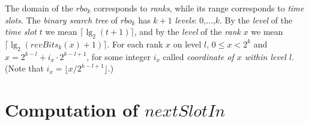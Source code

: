 \documentclass{llncs}
\begin{document}
The domain of the $rbo_k$ corresponds to {\em ranks}, while its range corresponds to {\em time slots}.
The {\em binary search tree} of $rbo_k$ has $k+1$ {\em levels}: $0$,$\ldots$,$k$.
By the {\em level} of the {\em time slot} $t$ we mean $\lceil \lg_2 (t+1)\rceil$,
and by the {\em level} of the {\em rank} $x$ we mean $\lceil \lg_2 (revBits_k(x)+1)\rceil$.
For each rank $x$ on level $l$, $0\le x<2^k$ and $x=2^{k-l}+i_x\cdot 2^{k-l+1}$, for some integer $i_x$
called {\em coordinate of $x$ within level $l$}.
(Note that $i_x=\lfloor x/2^{k-l+1}\rfloor$.)

 




\section{Computation of $nextSlotIn$}\label{nextSlotIn-section}
\end{document}
